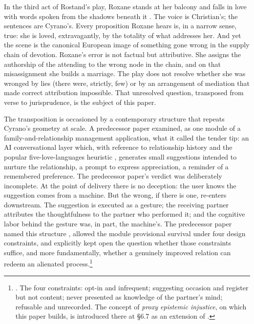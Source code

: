 In the third act of Rostand's play, Roxane stands at her balcony and falls in love with words spoken from the shadows beneath it \parencite{rostand1897cyrano}. The voice is Christian's; the sentences are Cyrano's. Every proposition Roxane hears is, in a narrow sense, true: she is loved, extravagantly, by the totality of what addresses her. And yet the scene is the canonical European image of something gone wrong in the supply chain of devotion. Roxane's error is not factual but attributive. She assigns the authorship of the attending to the wrong node in the chain, and on that misassignment she builds a marriage. The play does not resolve whether she was wronged by lies (there were, strictly, few) or by an arrangement of mediation that made correct attribution impossible. That unresolved question, transposed from verse to jurisprudence, is the subject of this paper.

The transposition is occasioned by a contemporary structure that repeats Cyrano's geometry at scale. A predecessor paper \parencite{huang2025toward} examined, as one module of a family-and-relationship management application, what it called the tender tip: an AI conversational layer which, with reference to relationship history and the popular five-love-languages heuristic \parencite[cited there with explicit qualifications]{chapman1992five}, generates small suggestions intended to nurture the relationship, a prompt to express appreciation, a reminder of a remembered preference. The predecessor paper's verdict was deliberately incomplete. At the point of delivery there is no deception: the user knows the suggestion comes from a machine. But the wrong, if there is one, re-enters downstream. The suggestion is executed as a gesture; the receiving partner attributes the thoughtfulness to the partner who performed it; and the cognitive labor behind the gesture was, in part, the machine's. The predecessor paper named this structure , allowed the module provisional survival under four design constraints, and explicitly kept open the question whether those constraints suffice, and more fundamentally, whether a genuinely improved relation can redeem an alienated process.\footnote{\textcite[\S 6.6, \S 6.7]{huang2025toward}. The four constraints: opt-in and infrequent; suggesting occasion and register but not content; never presented as knowledge of the partner's mind; refusable and unrecorded. The concept of \emph{proxy epistemic injustice}, on which this paper builds, is introduced there at \S 6.7 as an extension of \textcite{fricker2007epistemic}.}

